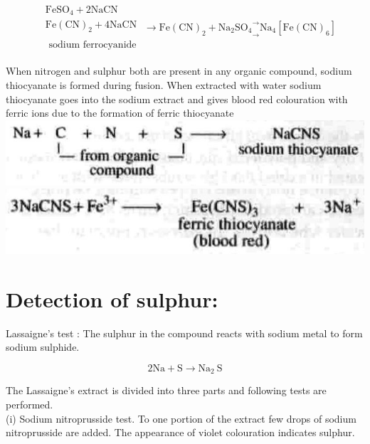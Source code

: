 \documentclass[10pt]{article}
\begin{document}
$$
\begin{aligned}
& \begin{array}{l}
\mathrm{FeSO}_{4}+2 \mathrm{NaCN} \\
\mathrm{Fe}(\mathrm{CN})_{2}+4 \mathrm{NaCN} \\
\\
\text { sodium ferrocyanide }
\end{array} \longrightarrow{\mathrm{Fe}(\mathrm{CN})_{2}+\mathrm{Na}_{2} \mathrm{SO}_{4}}_{\longrightarrow}^{\longrightarrow} \mathrm{Na}_{4}\left[\mathrm{Fe}(\mathrm{CN})_{6}\right]
\end{aligned}
$$

When nitrogen and sulphur both are present in any organic compound, sodium thiocyanate is formed during fusion. When extracted with water sodium thiocyanate goes into the sodium extract and gives blood red colouration with ferric ions due to the formation of ferric thiocyanate\\
\includegraphics[max width=\textwidth, center]{2025_01_28_8470952b98110cec3aabg-106(3)}\\
\includegraphics[max width=\textwidth, center]{2025_01_28_8470952b98110cec3aabg-106(4)}

\section*{Detection of sulphur:}
Lassaigne's test : The sulphur in the compound reacts with sodium metal to form sodium sulphide.

$$
2 \mathrm{Na}+\mathrm{S} \longrightarrow \mathrm{Na}_{2} \mathrm{~S}
$$

The Lassaigne's extract is divided into three parts and following tests are performed.\\
(i) Sodium nitroprusside test. To one portion of the extract few drops of sodium nitroprusside are added. The appearance of violet colouration indicates sulphur.
\end{document}
